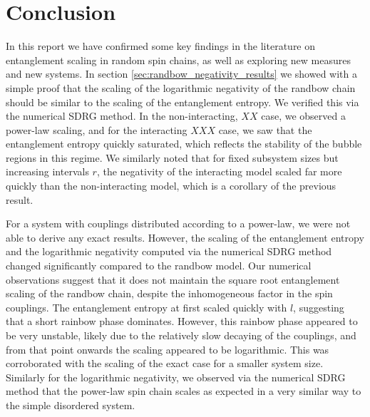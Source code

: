 
\section{Conclusion}\label{sec:conclusion}

In this report we have confirmed some key findings in the literature on entanglement scaling in random spin chains, as well as exploring new measures and new systems.
In section \ref{sec:randbow_negativity_results} we showed with a simple proof that the scaling of the logarithmic negativity of the randbow chain should be similar to the scaling of the entanglement entropy. We verified this via the numerical SDRG method. In the non-interacting, $XX$ case, we observed a power-law scaling, and for the interacting $XXX$ case, we saw that the entanglement entropy quickly saturated, which reflects the stability of the bubble regions in this regime. We similarly noted that for fixed subsystem sizes but increasing intervals $r$, the negativity of the interacting model scaled far more quickly than the non-interacting model, which is a corollary of the previous result.

For a system with couplings distributed according to a power-law, we were not able to derive any exact results. However, the scaling of the entanglement entropy and the logarithmic negativity computed via the numerical SDRG method changed significantly compared to the randbow model. Our numerical observations suggest that it does not maintain the square root entanglement scaling of the randbow chain, despite the inhomogeneous factor in the spin couplings. The entanglement entropy at first scaled quickly with $l$, suggesting that a short rainbow phase dominates. However, this rainbow phase appeared to be very unstable, likely due to the relatively slow decaying of the couplings, and from that point onwards the scaling appeared to be logarithmic. This was corroborated with the scaling of the exact case for a smaller system size. Similarly for the logarithmic negativity, we observed via the numerical SDRG method that the power-law spin chain scales as expected in a very similar way to the simple disordered system.



